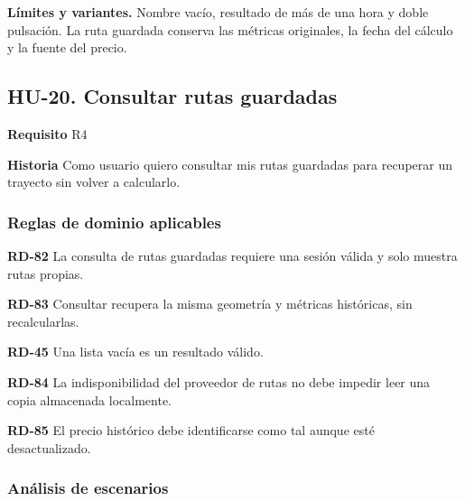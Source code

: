 {\fontsize{9}{11.8}\selectfont\textbf{Límites y variantes.} Nombre vacío, resultado de más de una hora y doble pulsación. La ruta guardada conserva las métricas originales, la fecha del cálculo y la fuente del precio.\par}\vspace{4pt}
\clearpage\subsection*{HU-20. Consultar rutas guardadas}

\textbf{Requisito} R4\par

\textbf{Historia} Como usuario quiero consultar mis rutas guardadas para recuperar un trayecto sin volver a calcularlo.\par

\subsubsection*{Reglas de dominio aplicables}

\textbf{RD-82} La consulta de rutas guardadas requiere una sesión válida y solo muestra rutas propias.\par

\textbf{RD-83} Consultar recupera la misma geometría y métricas históricas, sin recalcularlas.\par

\textbf{RD-45} Una lista vacía es un resultado válido.\par

\textbf{RD-84} La indisponibilidad del proveedor de rutas no debe impedir leer una copia almacenada localmente.\par

\textbf{RD-85} El precio histórico debe identificarse como tal aunque esté desactualizado.\par

\subsubsection*{Análisis de escenarios}

